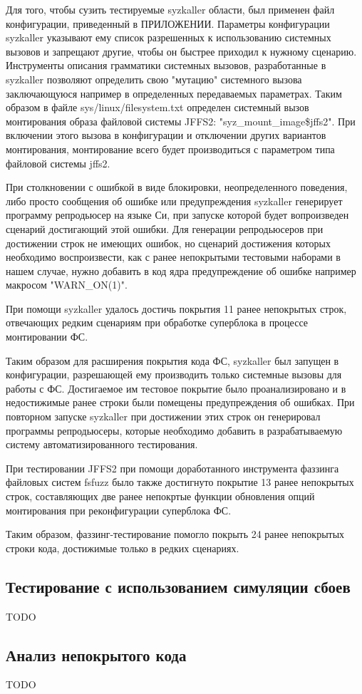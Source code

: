 Для того, чтобы сузить тестируемые syzkaller области, был применен файл конфигурации, приведенный в ПРИЛОЖЕНИИ. Параметры конфигурации syzkaller указывают ему список разрешенных к использованию системных вызовов и запрещают другие, чтобы он быстрее приходил к нужному сценарию. Инструменты описания грамматики системных вызовов, разработанные в syzkaller позволяют определить свою "мутацию" системного вызова заключающуюся например в определенных передаваемых параметрах. Таким образом в файле sys/linux/filesystem.txt определен системный вызов монтирования образа файловой системы JFFS2: "syz\_mount\_image\$jffs2". При включении этого вызова в конфигурации и отключении других вариантов монтирования, монтирование всего будет производиться с параметром типа файловой системы jffs2.

При столкновении с ошибкой в виде блокировки, неопределенного поведения, либо просто сообщения об ошибке или предупреждения syzkaller генерирует программу репродьюсер на языке Си, при запуске которой будет вопроизведен сценарий достигающий этой ошибки. Для генерации репродьюсеров при достижении строк не имеющих ошибок, но сценарий достижения которых необходимо воспроизвести, как с ранее непокрытыми тестовыми наборами в нашем случае, нужно добавить в код ядра предупреждение об ошибке например макросом "WARN\_ON(1)".

При помощи syzkaller удалось достичь покрытия 11 ранее непокрытых строк, отвечающих редким сценариям при обработке суперблока в процессе монтировании ФС.

Таким образом для расширения покрытия кода ФС, syzkaller был запущен в конфигурации, разрешающей ему производить только системные вызовы для работы с ФС. Достигаемое им тестовое покрытие было проанализировано и в недостижимые ранее строки были помещены предупреждения об ошибках. При повторном запуске syzkaller при достижении этих строк он генерировал программы репродьюсеры, которые необходимо добавить в разрабатываемую систему автоматизированного тестирования.

При тестировании JFFS2 при помощи доработанного инструмента фаззинга файловых систем fsfuzz было также достигнуто покрытие 13 ранее непокрытых строк, составляющих две ранее непокртые функции обновления опций монтирования при реконфигурации суперблока ФС.

Таким образом, фаззинг-тестирование помогло покрыть 24 ранее непокрытых строки кода, достижимые только в редких сценариях.

\subsection{Тестирование с использованием симуляции сбоев}

TODO

\subsection{Анализ непокрытого кода}

TODO

\newpage
